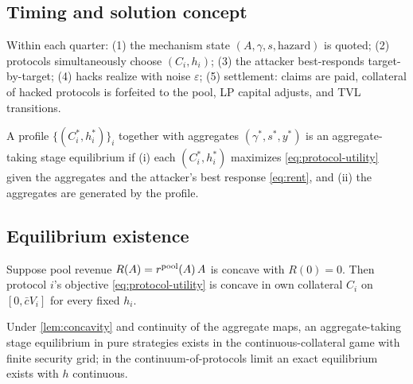 \subsection{Timing and solution concept}\label{sec:timing}

Within each quarter: (1) the mechanism state
$(A, \gamma, s, \text{hazard})$ is quoted; (2) protocols simultaneously
choose $(C_i, h_i)$; (3) the attacker best-responds target-by-target;
(4) hacks realize with noise $\varepsilon$; (5) settlement: claims are
paid, collateral of hacked protocols is forfeited to the pool, LP capital
adjusts, and TVL transitions. %

\begin{definition}\label{def:ate}
A profile $\{(C_i^*, h_i^*)\}_i$ together with aggregates
$(\gamma^*, s^*, y^*)$ is an aggregate-taking stage equilibrium if
(i) each $(C_i^*, h_i^*)$ maximizes \eqref{eq:protocol-utility} given the
aggregates and the attacker's best response \eqref{eq:rent}, and (ii) the
aggregates are generated by the profile.
\end{definition}


\subsection{Equilibrium existence}\label{sec:existence}

\begin{lemma}\label{lem:concavity}
Suppose pool revenue $R(A) = r^{\mathrm{pool}}(A)\,A$ is concave with
$R(0) = 0$. Then protocol $i$'s objective
\eqref{eq:protocol-utility} is concave in own collateral $C_i$ on
$[0, \bar{c} V_i]$ for every fixed $h_i$.
\end{lemma}

\begin{theorem}[Existence]\label{thm:existence}
Under \cref{lem:concavity} and continuity of the aggregate maps, an
aggregate-taking stage equilibrium in pure strategies exists in the
continuous-collateral game with finite security grid; in the
continuum-of-protocols limit an exact equilibrium exists with
$h$ continuous. %
\end{theorem}

